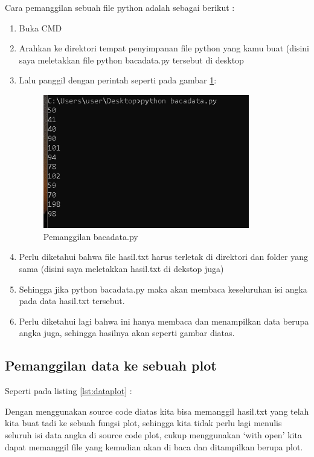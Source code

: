 Cara pemanggilan sebuah file python adalah sebagai berikut : 
\begin{enumerate}
\item Buka CMD
\item Arahkan ke direktori tempat penyimpanan file python yang kamu buat (disini saya meletakkan file python bacadata.py tersebut di desktop
\item Lalu panggil dengan perintah seperti pada gambar \ref{fig:bacadata}:
\begin{figure}[!htbp]
	\centerline{\includegraphics[width=0.85\textwidth]{figures/6/bacadata.PNG}}
	\caption{Pemanggilan bacadata.py}
	\label{fig:bacadata}
\end{figure}

\item Perlu diketahui bahwa file hasil.txt harus terletak di direktori dan folder yang sama (disini saya meletakkan hasil.txt di dekstop juga)
\item Sehingga jika python bacadata.py maka akan membaca keseluruhan isi angka pada data hasil.txt tersebut.
\item Perlu diketahui lagi bahwa ini hanya membaca dan menampilkan data berupa angka juga, sehingga hasilnya akan seperti gambar diatas.
\end{enumerate}
 
\subsection{Pemanggilan data ke sebuah plot}
Seperti pada listing \ref{lst:dataplot} : 


Dengan menggunakan source code diatas kita bisa memanggil hasil.txt yang telah kita buat tadi ke sebuah fungsi plot, sehingga kita tidak perlu lagi menulis seluruh isi data angka di source code plot, cukup menggunakan ‘with open’ kita dapat memanggil file yang kemudian akan di baca dan ditampilkan berupa plot.


